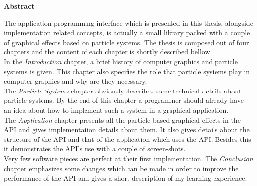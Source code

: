 \thispagestyle{plain}

\begin{center}
	\textbf{Abstract}
\end{center}

The application programming interface which is presented in this thesis, alongside implementation related concepts, is actually a small library packed with a couple of graphical effects based on particle systems. The thesis is composed out of four chapters and the content of each chapter is shortly described bellow.\\

In the \textit{Introduction} chapter, a brief history of computer graphics and particle systems is given. This chapter also specifies the role that particle systems play in computer graphics and why are they necessary.\\

The \textit{Particle Systems} chapter obviously describes some technical details about particle systems. By the end of this chapter a programmer should already have an idea about how to implement such a system in a graphical application.\\

The \textit{Application} chapter presents all the particle based graphical effects in the API and gives implementation details about them. It also gives details about the structure of the API and that of the application which uses the API. Besides this it demonstrates the API's use with a couple of screen-shots.\\

Very few software pieces are perfect at their first implementation. The \textit{Conclusion} chapter emphasizes some changes which can be made in order to improve the performance of the API and gives a short description of my learning experience.